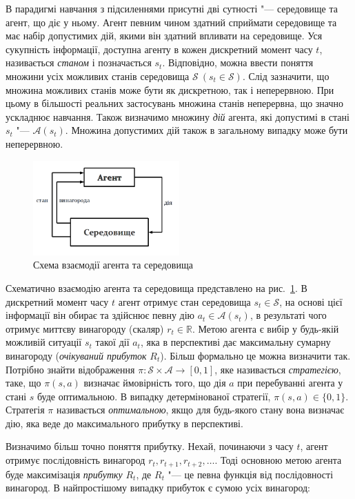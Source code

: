 \documentclass[a4paper,10pt,fleqn]{article}
\begin{document}
В парадигмі навчання з підсиленнями присутні дві сутності "--- середовище та агент, що діє у ньому. Агент певним чином здатний сприймати середовище та має набір допустимих дій, якими він здатний впливати на середовище. Уся сукупність інформації, доступна агенту в кожен дискретний момент часу $t$, називається \emph{станом} і позначається $s_t$. Відповідно, можна ввести поняття множини усіх можливих станів середовища $\mathcal{S}\ (s_t \in \mathcal{S})$. Слід зазначити, що множина можливих станів може бути як дискретною, так і неперервною. При цьому в більшості реальних застосувань множина станів неперервна, що значно ускладнює навчання. Також визначимо множину \emph{дій} агента, які допустимі в стані $s_t$ "--- $\mathcal{A}(s_t)$. Множина допустимих дій також в загальному випадку може бути неперервною.

\begin{figure}
\centering
\includegraphics[width=0.5\textwidth]{agent-env-diagram.png}
\caption{Схема взаємодії агента та середовища}
\label{fig:agent-env-diagram}
\end{figure}
Схематично взаємодію агента та середовища представлено на рис.~\ref{fig:agent-env-diagram}. В дискретний момент часу $t$ агент отримує стан середовища $s_t \in \mathcal{S}$, на основі цієї інформації він обирає та здійснює певну дію $a_t \in \mathcal{A}(s_t)$, в результаті чого отримує миттєву винагороду (скаляр) $r_t \in \mathbb{R}$. Метою агента є вибір у будь-якій можливій ситуації $s_t$ такої дії $a_t$, яка в перспективі дає максимальну сумарну винагороду (\emph{очікуваний прибуток} $R_t$). Більш формально це можна визначити так. Потрібно знайти відображення $\pi:\mathcal{S}\times\mathcal{A} \rightarrow [0,1]$, яке називається \emph{стратегією}, таке, що $\pi(s, a)$ визначає ймовірність того, що дія $a$ при перебуванні агента у стані $s$ буде оптимальною. В випадку детермінованої стратегії, $\pi(s,a) \in \{0,1\}$. Стратегія $\pi$ називається \emph{оптимальною}, якщо для будь-якого стану вона визначає дію, яка веде до максимального прибутку в перспективі.

Визначимо більш точно поняття прибутку. Нехай, починаючи з часу $t$, агент отримує послідовність винагород $r_{t}, r_{t+1}, r_{t+2}, \ldots$. Тоді основною метою агента буде максимізація \emph{прибутку} $R_t$, де $R_t$ "--- це певна функція від послідовності винагород. В найпростішому випадку прибуток є сумою усіх винагород:
\end{document}
